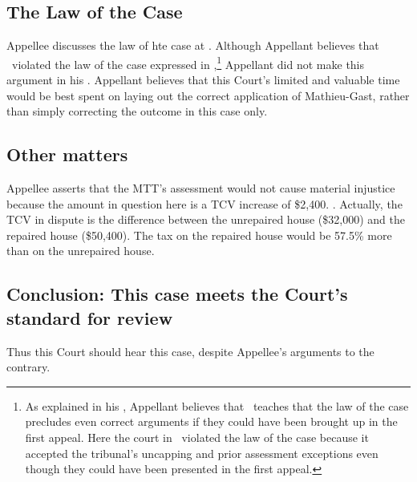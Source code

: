 \documentclass[12pt,\documentclassflag]{michiganCourtOfAppealsBrief}
\begin{document}
\subsection{The Law of the Case}

Appellee discusses the law of hte case at . Although Appellant believes that \cite{Patru II}\ violated the law of the case expressed in \cite{Patru I},\footnote{As explained in his , Appellant believes that \ teaches that the law of the case precludes even correct arguments if they could have been brought up in the first appeal. Here the court in \cite{Patru II}\ violated the law of the case because it accepted the tribunal's uncapping and prior assessment exceptions even though they could have been presented in the first appeal.} Appellant did not make this argument in his \cite{Leave to Appeal}. Appellant believes that this Court's limited and valuable time would be best spent on laying out the correct application of Mathieu-Gast, rather than simply correcting the outcome in this case only.

\subsection{Other matters}

Appellee asserts that the MTT's assessment would not cause material injustice because the amount in question here is a TCV increase of \$2,400. . Actually, the TCV in dispute is the difference between the unrepaired house (\$32,000) and the repaired house (\$50,400). The tax on the repaired house would be 57.5\% more than on the unrepaired house.

\subsection{Conclusion: This case meets the Court's standard for review}

Thus this Court should hear this case, despite Appellee's arguments to the contrary.
\end{document}
